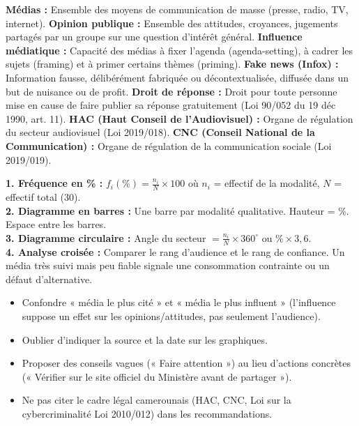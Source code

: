 \documentclass[11pt]{article}
\newcommand{\cle}[1]{{\popxbold\color{popdark}#1}}
\newcounter{popsec}
\newcounter{popsub}
\newcommand{\courssub}[1]{%
  \stepcounter{popsub}%
  \par\vspace{9pt}\noindent{\popxbold\fontsize{11.5}{13}\selectfont\color{popink}{\color{poporange}\thepopsec.\thepopsub}\hspace{6pt}#1}\par\nopagebreak\vspace{4pt}
}
\begin{document}
\courssub{Ressources à mobiliser}
\begin{definition}
\textbf{Médias :} Ensemble des moyens de communication de masse (presse, radio, TV, internet). \textbf{Opinion publique :} Ensemble des attitudes, croyances, jugements partagés par un groupe sur une question d'intérêt général. \textbf{Influence médiatique :} Capacité des médias à fixer l'agenda (\cle{agenda-setting}), à cadrer les sujets (\cle{framing}) et à primer certains thèmes (\cle{priming}). \textbf{Fake news (Infox) :} Information fausse, délibérément fabriquée ou décontextualisée, diffusée dans un but de nuisance ou de profit. \textbf{Droit de réponse :} Droit pour toute personne mise en cause de faire publier sa réponse gratuitement (Loi 90/052 du 19 déc 1990, art. 11). \textbf{HAC (Haut Conseil de l'Audiovisuel) :} Organe de régulation du secteur audiovisuel (Loi 2019/018). \textbf{CNC (Conseil National de la Communication) :} Organe de régulation de la communication sociale (Loi 2019/019).
\end{definition}

\begin{methode}
\textbf{1. Fréquence en \% :} $f_i (\%) = \frac{n_i}{N} \times 100$ où $n_i$ = effectif de la modalité, $N$ = effectif total (30).\\
\textbf{2. Diagramme en barres :} Une barre par modalité qualitative. Hauteur = \%. Espace entre les barres.\\
\textbf{3. Diagramme circulaire :} Angle du secteur $= \frac{n_i}{N} \times 360^\circ$ ou $\% \times 3,6$.\\
\textbf{4. Analyse croisée :} Comparer le rang d'audience et le rang de confiance. Un média très suivi mais peu fiable signale une \cle{consommation contrainte} ou un défaut d'alternative.
\end{methode}

\begin{attention}
\begin{itemize}
    \item Confondre « média le plus cité » et « média le plus influent » (l'influence suppose un effet sur les opinions/attitudes, pas seulement l'audience).
    \item Oublier d'indiquer la source et la date sur les graphiques.
    \item Proposer des conseils vagues (« Faire attention ») au lieu d'actions concrètes (« Vérifier sur le site officiel du Ministère avant de partager »).
    \item Ne pas citer le cadre légal camerounais (HAC, CNC, Loi sur la cybercriminalité Loi 2010/012) dans les recommandations.
\end{itemize}
\end{attention}
\end{document}
